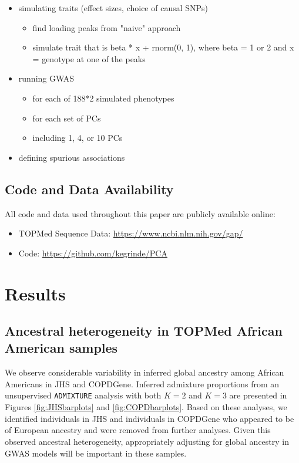 \documentclass[12pt]{article}
\newcommand{\edit}[1]{{\color{red}{#1}}}
\begin{document}
\begin{itemize}
\item simulating traits (effect sizes, choice of causal SNPs)
	\begin{itemize}
	\item find loading peaks from "naive" approach
	\item simulate trait that is beta * x + rnorm(0, 1), where beta = 1 or 2 and x = genotype at one of the peaks
	\end{itemize}
\item running GWAS
	\begin{itemize}
	\item for each of 188*2 simulated phenotypes
	\item for each set of PCs
	\item including 1, 4, or 10 PCs
	\end{itemize}
\item defining spurious associations
\end{itemize}


\subsection{Code and Data Availability}

All code and data used throughout this paper are publicly available online: 

\begin{itemize}
\item TOPMed Sequence Data: \href{https://www.ncbi.nlm.nih.gov/gap/}{https://www.ncbi.nlm.nih.gov/gap/}
\item Code: \href{https://github.com/kegrinde/PCA}{https://github.com/kegrinde/PCA}
\end{itemize}


\section{Results}

\subsection{Ancestral heterogeneity in TOPMed African American samples}

We observe considerable variability in inferred global ancestry among African Americans in JHS and COPDGene. 
Inferred admixture proportions from an unsupervised \texttt{ADMIXTURE} analysis with both $K = 2$ and $K = 3$ are presented in Figures \ref{fig:JHSbarplots} and \ref{fig:COPDbarplots}. 
Based on these analyses, we identified \edit{???} individuals in JHS and \edit{???} individuals in COPDGene who appeared to be of European ancestry and were removed from further analyses.
Given this observed ancestral heterogeneity, appropriately adjusting for global ancestry in GWAS models will be important in these samples.
\end{document}
